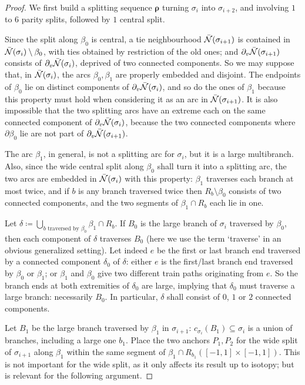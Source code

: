 \begin{proof}
We first build a splitting sequence $\bm\rho$ turning $\sigma_i$ into $\sigma_{i+2}$, and involving $1$ to $6$ parity splits, followed by $1$ central split.

Since the split along $\beta_0$ is central, a tie neighbourhood $\bar{{\mathcal N}}(\sigma_{i+1})$ is contained in $\bar{{\mathcal N}}(\sigma_i)\setminus \beta_0$, with ties obtained by restriction of the old ones; and $\partial_v\bar{{\mathcal N}}(\sigma_{i+1})$ consists of $\partial_v\bar{{\mathcal N}}(\sigma_i)$, deprived of two connected components. So we may suppose that, in $\bar{{\mathcal N}}(\sigma_i)$, the arcs $\beta_0,\beta_1$ are properly embedded and disjoint. The endpoints of $\beta_0$ lie on distinct components of $\partial_v\bar{{\mathcal N}}(\sigma_i)$, and so do the ones of $\beta_1$ because this property must hold when considering it as an arc in $\bar{{\mathcal N}}(\sigma_{i+1})$. It is also impossible that the two splitting arcs have an extreme each on the same connected component of $\partial_v\bar{{\mathcal N}}(\sigma_i)$, because the two connected components where $\partial\beta_0$ lie are not part of $\partial_v\bar{{\mathcal N}}(\sigma_{i+1})$.

The arc $\beta_1$, in general, is not a splitting arc for $\sigma_i$, but it is a large multibranch. Also, since the wide central split along $\beta_0$ shall turn it into a splitting arc, the two arcs are embedded in $\bar{{\mathcal N}}(\sigma_i)$ with this property: $\beta_1$ traverses each branch at most twice, and if $b$ is any branch traversed twice then $R_b\setminus \beta_0$ consists of two connected components, and the two segments of $\beta_1\cap R_b$ each lie in one.

Let $\delta\coloneqq \bigcup_{b\text{ traversed by }\beta_0} \beta_1\cap R_b$. If $B_0$ is the large branch of $\sigma_i$ traversed by $\beta_0$, then each component of $\delta$ traverses $B_0$ (here we use the term `traverse' in an obvious generalized setting). Let indeed $e$ be the first or last branch end traversed by a connected component $\delta_0$ of $\delta$: either $e$ is the first/last branch end traversed by $\beta_0$ or $\beta_1$; or $\beta_1$ and $\beta_0$ give two different train paths originating from $e$. So the branch ends at both extremities of $\delta_0$ are large, implying that $\delta_0$ must traverse a large branch: necessarily $B_0$. In particular, $\delta$ shall consist of $0$, $1$ or $2$ connected components.

Let $B_1$ be the large branch traversed by $\beta_1$ in $\sigma_{i+1}$: $c_{\sigma_i}(B_1)\subseteq \sigma_i$ is a union of branches, including a large one $b_1$. Place the two anchors $P_1,P_2$ for the wide split of $\sigma_{i+1}$ along $\beta_1$ within the same segment of $\beta_1\cap R_{b_1}([-1,1]\times[-1,1])$. This is not important for the wide split, as it only affects its result up to isotopy; but is relevant for the following argument.


\end{proof}
